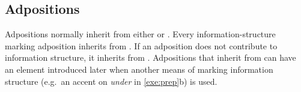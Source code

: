 


\subsection{Adpositions}
\label{10:ssec:adpositions}


Adpositions normally inherit from either 
or . Every
information-structure marking adposition inherits from
.  If an adposition does not contribute to
information structure, it inherits from .
Adpositions that inherit from  can have an
 element introduced later when another means of marking
information structure (e.g.\ an accent on \textit{under} in
\ref{exe:prep}b) is used.






